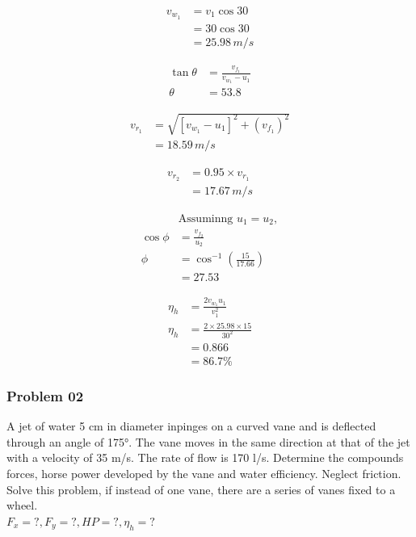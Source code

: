 \documentclass{article}
\begin{document}
\begin{multicols}{3}
  \begin{align*}
    v_{w_1} &= v_1 \cos 30 \\
    &= 30 \cos 30 \\ 
    &= 25.98 \, m/s   
  \end{align*}

  \begin{align*}
    \tan \theta &= \frac{v_{f_1}}{v_{w_1} - u_1}\\
    \theta &= 53.8    
  \end{align*}

  \begin{align*}
    v_{r_1} &= \sqrt{\left[v_{w_1} - u_1\right]^2 + (v_{f_1})^2}\\
    &= 18.59 \, m/s   
  \end{align*}

  \begin{align*}
    v_{r_2} &= 0.95 \times v_{r_1}\\
    &= 17.67 \, m/s   
  \end{align*}

  \begin{align*}
    & \text{Assuminng } u_1 = u_2, \\
    \cos \phi &= \frac{v_{f_2}}{u_2}\\
    \phi &= \cos^{-1} \left(\frac{15}{17.66}\right) \\ 
    &= 27.53 
  \end{align*}

  \begin{align*}
    \eta_h &= \frac{2 v_{w_1} u_1}{v_1^2}\\
    \eta_h &= \frac{2 \times 25.98 \times 15}{30^2}\\
    &= 0.866 \\
    &= 86.7\%  
  \end{align*}


\end{multicols}

\subsubsection*{Problem 02}
A jet of water 5 cm in diameter inpinges on a curved vane and is deflected through an angle of 175°. The vane moves in the same direction at that of the jet with a velocity of 35 m/s. The rate of flow is 170 l/s. Determine the compounds forces, horse power developed by the vane and water efficiency. Neglect friction. Solve this problem, if instead of one vane, there are a series of vanes fixed to a wheel.\\
$F_x = ?, F_y = ? , HP = ?, \eta_h = ?$\\
\end{document}
